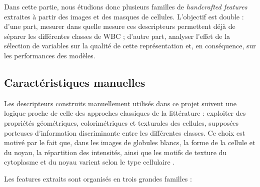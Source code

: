 \documentclass[journal,twocolumn]{IEEEtran}
\begin{document}
Dans cette partie, nous étudions donc plusieurs familles de \textit{handcrafted features} extraites à partir des images et des masques de cellules. L’objectif est double : d’une part, mesurer dans quelle mesure ces descripteurs permettent déjà de séparer les différentes classes de WBC ; d’autre part, analyser l’effet de la sélection de variables sur la qualité de cette représentation et, en conséquence, sur les performances des modèles.

\subsection{Caractéristiques manuelles}

Les descripteurs construits manuellement utilisés dans ce projet suivent une logique proche de celle des approches classiques de la littérature : exploiter des propriétés géométriques, colorimétriques et texturales des cellules, supposées porteuses d’information discriminante entre les différentes classes. Ce choix est motivé par le fait que, dans les images de globules blancs, la forme de la cellule et du noyau, la répartition des intensités, ainsi que les motifs de texture du cytoplasme et du noyau varient selon le type cellulaire \cite{REZATOFIGHI2011333,healthcare10112230}.

Les features extraits sont organisés en trois grandes familles :
\end{document}
